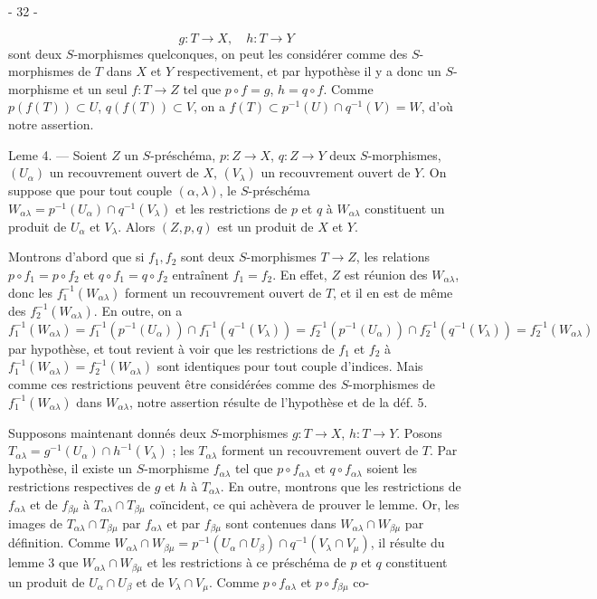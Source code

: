 \newpage


- 32 -

$$ g : T \to X , \quad h : T \to Y $$
sont deux $S$-morphismes quelconques, on peut les considérer comme des $S$-morphismes de $T$ dans $X$ et $Y$ respectivement, et par hypothèse il y a donc un $S$-morphisme et un seul $f : T \to Z$ tel que $p \circ f = g$, $h = q \circ f$. Comme $p(f(T)) \subset U$, $q(f(T)) \subset V$, on a $f(T) \subset p^{-1}(U) \cap q^{-1}(V) = W$, d'où notre assertion.

Leme 4. — Soient $Z$ un $S$-préschéma, $p : Z \to X$, $q : Z \to Y$ deux $S$-morphismes, $(U_\alpha)$ un recouvrement ouvert de $X$, $(V_\lambda)$ un recouvrement ouvert de $Y$. On suppose que pour tout couple $(\alpha, \lambda)$, le $S$-préschéma $W_{\alpha\lambda} = p^{-1}(U_\alpha) \cap q^{-1}(V_\lambda)$ et les restrictions de $p$ et $q$ à $W_{\alpha\lambda}$ constituent un produit de $U_\alpha$ et $V_\lambda$. Alors $(Z, p, q)$ est un produit de $X$ et $Y$.

Montrons d'abord que si $f_1, f_2$ sont deux $S$-morphismes $T \to Z$, les relations $p \circ f_1 = p \circ f_2$ et $q \circ f_1 = q \circ f_2$ entraînent $f_1 = f_2$. En effet, $Z$ est réunion des $W_{\alpha\lambda}$, donc les $f_1^{-1}(W_{\alpha\lambda})$ forment un recouvrement ouvert de $T$, et il en est de même des $f_2^{-1}(W_{\alpha\lambda})$. En outre, on a $f_1^{-1}(W_{\alpha\lambda}) = f_1^{-1}(p^{-1}(U_\alpha)) \cap f_1^{-1}(q^{-1}(V_\lambda)) = f_2^{-1}(p^{-1}(U_\alpha)) \cap f_2^{-1}(q^{-1}(V_\lambda)) = f_2^{-1}(W_{\alpha\lambda})$ par hypothèse, et tout revient à voir que les restrictions de $f_1$ et $f_2$ à $f_1^{-1}(W_{\alpha\lambda}) = f_2^{-1}(W_{\alpha\lambda})$ sont identiques pour tout couple d'indices. Mais comme ces restrictions peuvent être considérées comme des $S$-morphismes de $f_1^{-1}(W_{\alpha\lambda})$ dans $W_{\alpha\lambda}$, notre assertion résulte de l'hypothèse et de la déf. 5.

Supposons maintenant donnés deux $S$-morphismes $g : T \to X$, $h : T \to Y$. Posons $T_{\alpha\lambda} = g^{-1}(U_\alpha) \cap h^{-1}(V_\lambda)$ ; les $T_{\alpha\lambda}$ forment un recouvrement ouvert de $T$. Par hypothèse, il existe un $S$-morphisme $f_{\alpha\lambda}$ tel que $p \circ f_{\alpha\lambda}$ et $q \circ f_{\alpha\lambda}$ soient les restrictions respectives de $g$ et $h$ à $T_{\alpha\lambda}$. En outre, montrons que les restrictions de $f_{\alpha\lambda}$ et de $f_{\beta\mu}$ à $T_{\alpha\lambda} \cap T_{\beta\mu}$ coïncident, ce qui achèvera de prouver le lemme. Or, les images de $T_{\alpha\lambda} \cap T_{\beta\mu}$ par $f_{\alpha\lambda}$ et par $f_{\beta\mu}$ sont contenues dans $W_{\alpha\lambda} \cap W_{\beta\mu}$ par définition. Comme $W_{\alpha\lambda} \cap W_{\beta\mu} = p^{-1}(U_\alpha \cap U_\beta) \cap q^{-1}(V_\lambda \cap V_\mu)$, il résulte du lemme 3 que $W_{\alpha\lambda} \cap W_{\beta\mu}$ et les restrictions à ce préschéma de $p$ et $q$ constituent un produit de $U_\alpha \cap U_\beta$ et de $V_\lambda \cap V_\mu$. Comme $p \circ f_{\alpha\lambda}$ et $p \circ f_{\beta\mu}$ co-

